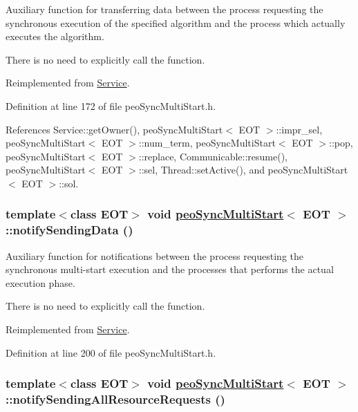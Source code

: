 Auxiliary function for transferring data between the process requesting the synchronous execution of the specified algorithm and the process which actually executes the algorithm. 

There is no need to explicitly call the function. 

Reimplemented from \hyperlink{classService_45c06344edbfa482b91f68e2035a6099}{Service}.

Definition at line 172 of file peo\-Sync\-Multi\-Start.h.

References Service::get\-Owner(), peo\-Sync\-Multi\-Start$<$ EOT $>$::impr\_\-sel, peo\-Sync\-Multi\-Start$<$ EOT $>$::num\_\-term, peo\-Sync\-Multi\-Start$<$ EOT $>$::pop, peo\-Sync\-Multi\-Start$<$ EOT $>$::replace, Communicable::resume(), peo\-Sync\-Multi\-Start$<$ EOT $>$::sel, Thread::set\-Active(), and peo\-Sync\-Multi\-Start$<$ EOT $>$::sol.\hypertarget{classpeoSyncMultiStart_32ec0d01d3fd8a9932abd68f4781fc94}{
\subsubsection[notifySendingData]{\setlength{\rightskip}{0pt plus 5cm}template$<$class EOT$>$ void \hyperlink{classpeoSyncMultiStart}{peo\-Sync\-Multi\-Start}$<$ EOT $>$::notify\-Sending\-Data ()}}
\label{classpeoSyncMultiStart_32ec0d01d3fd8a9932abd68f4781fc94}


Auxiliary function for notifications between the process requesting the synchronous multi-start execution and the processes that performs the actual execution phase. 

There is no need to explicitly call the function. 

Reimplemented from \hyperlink{classService_81ad4d6ebb50045b8977e2ab74826f30}{Service}.

Definition at line 200 of file peo\-Sync\-Multi\-Start.h.\hypertarget{classpeoSyncMultiStart_fc90282cc4e93cdea8f82fd52dd78fb0}{
\subsubsection[notifySendingAllResourceRequests]{\setlength{\rightskip}{0pt plus 5cm}template$<$class EOT$>$ void \hyperlink{classpeoSyncMultiStart}{peo\-Sync\-Multi\-Start}$<$ EOT $>$::notify\-Sending\-All\-Resource\-Requests ()}}
\label{classpeoSyncMultiStart_fc90282cc4e93cdea8f82fd52dd78fb0}



